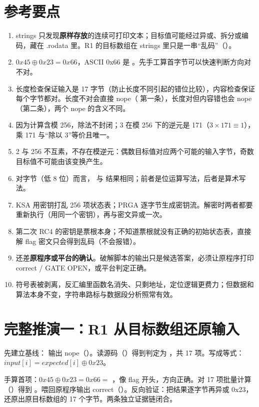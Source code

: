 \documentclass[UTF8,12pt,oneside]{ctexbook}
\begin{document}
\section{参考要点}
\begin{enumerate}
\item strings 只发现\textbf{原样存放}的连续可打印文本；目标值可能经过异或、拆分或编码，藏在 .rodata 里。R1 的目标数组在 strings 里只是一串“乱码”（）。
\item $0x45\oplus0x23 = 0x66$，ASCII 0x66 是 。先手工算首字节可以快速判断方向对不对。
\item 长度检查保证输入是 17 字节（防止长度不同引起的错位比较），内容检查保证每个字节都对。长度不对会直接 nope（ 第一条），长度对但内容错也会 nope（第二条），两个 nope 的含义不同。
\item 因为计算含模 256，除法不封闭；3 在模 256 下的逆元是 171（$3\times171\equiv1$），乘 171 与“除以 3”等价且唯一。
\item 2 与 256 不互素，不存在模逆元：偶数目标值对应两个可能的输入字节，奇数目标值不可能由该变换产生。
\item 对字节（低 8 位）而言， 与  结果相同；前者是位运算写法，后者是算术写法。
\item KSA 用密钥打乱 256 项状态表；PRGA 逐字节生成密钥流。解密时两者都要重新执行（用同一个密钥），再与密文异或一次。
\item 第二次 RC4 的密钥是票根本身；不知道票根就没有正确的初始状态表，直接解 flag 密文只会得到乱码（不会报错）。
\item 还差\textbf{原程序或平台的确认}。破解脚本的输出只是候选答案，必须让原程序打印 correct / GATE OPEN，或平台判定正确。
\item 符号表被剥离，反汇编里函数名消失、只剩地址，定位逻辑更费力；但数据和算法本身不变，字符串路标与数据段分析照常有效。
\end{enumerate}

\section{完整推演一：R1 从目标数组还原输入}
先建立基线： 输出 nope（）。读源码（）得到判定为 ，共 17 项。写成等式：$input[i] = expected[i] \oplus 0x23$。

手算首项：$0x45 \oplus 0x23 = 0x66 = $ ，像 flag 开头，方向正确。对 17 项批量计算（）得到 。喂回原程序输出 correct（）。反向验证：把结果逐字节再异或 0x23，还原出原目标数组的 17 个字节。两条独立证据链闭合。
\end{document}
